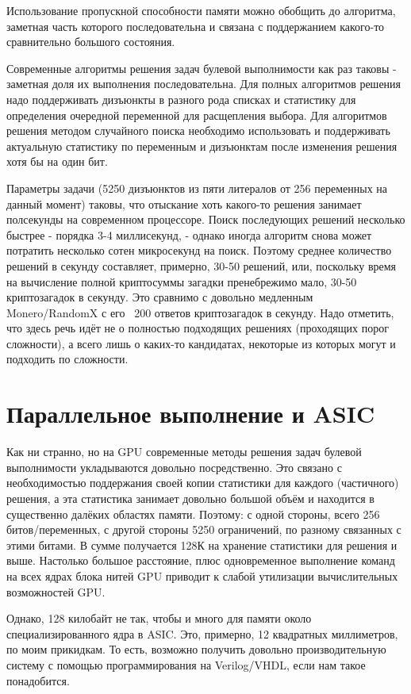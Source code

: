 \documentclass[acmlarge,screen]{acmart}
\begin{document}
Использование пропускной способности памяти можно обобщить до алгоритма, заметная часть которого 
последовательна и связана с поддержанием какого-то сравнительно большого состояния.

Современные алгоритмы решения задач булевой выполнимости как раз таковы - заметная доля их 
выполнения последовательна. Для полных алгоритмов решения надо поддерживать дизъюнкты в разного 
рода списках и статистику для определения очередной переменной для расщепления выбора. 
Для алгоритмов решения методом случайного поиска необходимо использовать и поддерживать 
актуальную статистику по переменным и дизъюнктам после изменения решения хотя бы на один бит.

Параметры задачи (5250 дизъюнктов из пяти литералов от 256 переменных на данный момент) таковы, что отыскание хоть какого-то решения занимает полсекунды на современном процессоре. Поиск последующих решений несколько быстрее - порядка 3-4 миллисекунд, - однако иногда алгоритм снова может потратить несколько сотен микросекунд на поиск. Поэтому среднее количество решений в секунду составляет, примерно, 30-50 решений, или, поскольку время на вычисление полной криптосуммы загадки пренебрежимо мало, 30-50 криптозагадок в секунду. Это сравнимо с довольно медленным Monero/RandomX с его ~200 ответов криптозагадок в секунду. Надо отметить, что здесь речь идёт не о полностью подходящих решениях (проходящих порог сложности), а всего лишь о каких-то кандидатах, некоторые из которых могут и подходить по сложности.

\section{Параллельное выполнение и ASIC}

Как ни странно, но на GPU современные методы решения задач булевой выполнимости укладываются 
довольно посредственно. Это связано с необходимостью поддержания своей копии 
статистики для каждого (частичного) решения, а эта статистика занимает довольно большой объём 
и находится в существенно далёких областях памяти. Поэтому: с одной стороны, всего 256 битов/переменных, 
с другой стороны 5250 ограничений, по разному связанных с этими битами. В сумме получается 128К 
на хранение статистики для решения и выше. Настолько большое расстояние, плюс одновременное 
выполнение команд на всех ядрах блока нитей GPU приводит к слабой утилизации вычислительных возможностей GPU.

Однако, 128 килобайт не так, чтобы и много для памяти около специализированного ядра в ASIC. Это, 
примерно, 12 квадратных миллиметров, по моим прикидкам. То есть, возможно получить довольно 
производительную систему с помощью программирования на Verilog/VHDL, если нам такое понадобится.
\end{document}
